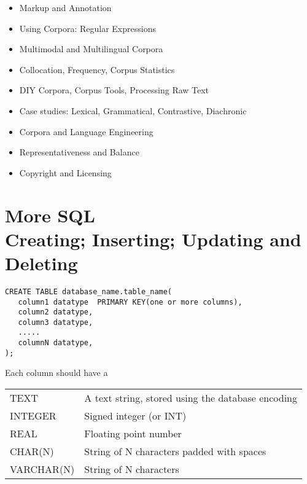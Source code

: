 \documentclass[a4paper,landscape,headrule,footrule,dvips]{foils}
\begin{document}
\begin{CJK}{UTF8}{min}

\maketitle



\begin{itemize} \addtolength{\itemsep}{-0.3\itemsep}
\item Markup and Annotation 
\item Using Corpora: Regular Expressions
\item Multimodal and Multilingual Corpora 
\item Collocation, Frequency, Corpus Statistics 
\item DIY Corpora, Corpus Tools, Processing Raw Text 
\item Case studies: Lexical, Grammatical, Contrastive, Diachronic
\item Corpora and Language Engineering 
\item Representativeness and Balance
\item Copyright and Licensing
\end{itemize}




\section{More SQL \\ Creating; Inserting; Updating and Deleting}

\begin{verbatim}
CREATE TABLE database_name.table_name(
   column1 datatype  PRIMARY KEY(one or more columns),
   column2 datatype,
   column3 datatype,
   .....
   columnN datatype,
);
\end{verbatim}

Each column should have a 

\begin{tabular}{ll}
  TEXT & 	A text string, stored using the database encoding\\
  INTEGER	& Signed integer (or INT)\\
  REAL	& Floating point number \\
  CHAR(N)  & String of N characters padded with spaces \\
  VARCHAR(N)  & String of N characters
\end{tabular}


\end{CJK}
\end{document}

